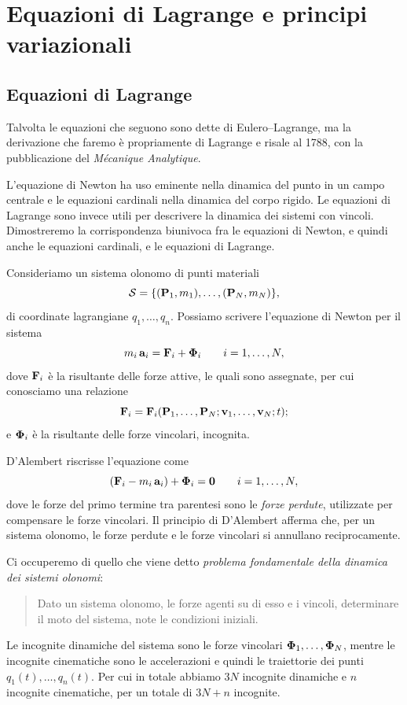 \chapter{Equazioni di Lagrange e principi variazionali}
\section{Equazioni di Lagrange}
Talvolta le equazioni che seguono sono dette di Eulero--Lagrange, ma la derivazione che faremo è propriamente di Lagrange e risale al 1788, con la pubblicazione del \emph{Mécanique Analytique}.

 L'equazione di Newton ha uso eminente nella dinamica del punto in un campo centrale e le equazioni cardinali nella dinamica del corpo rigido. Le equazioni di Lagrange sono invece utili per descrivere la dinamica dei sistemi con vincoli. Dimostreremo la corrispondenza biunivoca fra le equazioni di Newton, e quindi anche le equazioni cardinali, e le equazioni di Lagrange.

Consideriamo un sistema olonomo di punti materiali
\begin{equation*}
    \mathcal{S} = \{(\vb{P}_1, m_1), \dots, (\vb{P}_N, m_N)\},
\end{equation*}
di coordinate lagrangiane $q_1, \dots, q_n$.
Possiamo scrivere l'equazione di Newton per il sistema
\begin{equation*}
    m_i\,\vb{a}_i = \vb{F}_i + \vb{\Phi}_i \qquad i = 1, \dots, N,
\end{equation*}
dove $\vb{F}_i$ è la risultante delle forze attive, le quali sono assegnate, per cui conosciamo una relazione
\begin{equation*}
    \vb{F}_i = \vb{F}_i(\vb{P}_1, \dots, \vb{P}_N; \vb{v}_1, \dots, \vb{v}_N; t);
\end{equation*}
e $\vb{\Phi}_i$ è la risultante delle forze vincolari, incognita.

D'Alembert riscrisse l'equazione come
\begin{equation}
    \label{eq:dalambert}
    (\vb{F}_i -m_i\,\vb{a}_i) + \vb{\Phi}_i = \vb{0} \qquad i = 1, \dots, N,
\end{equation}
dove le forze del primo termine tra parentesi sono le \emph{forze perdute}, utilizzate per compensare le forze vincolari. Il principio di D'Alembert afferma che, per un sistema olonomo, le forze perdute e le forze vincolari si annullano reciprocamente.

Ci occuperemo di quello che viene detto \emph{problema fondamentale della dinamica dei sistemi olonomi}:
\begin{quote}
    Dato un sistema olonomo, le forze agenti su di esso e i vincoli, determinare il moto del sistema, note le condizioni iniziali.
\end{quote}
Le incognite dinamiche del sistema sono le forze vincolari $\vb{\Phi}_1,\dots, \vb{\Phi}_N$, mentre le incognite cinematiche sono le accelerazioni e quindi le traiettorie dei punti $q_1(t), \dots, q_n(t)$. Per cui in totale abbiamo $3N$ incognite dinamiche e $n$ incognite cinematiche, per un totale di $3N + n$ incognite.

